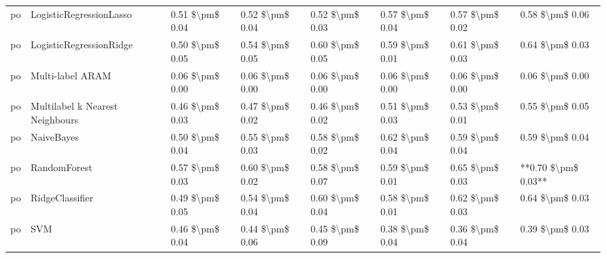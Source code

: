 \begin{tabular}{llllllll}
      po &         LogisticRegressionLasso & 0.51 \$\textbackslash pm\$ 0.04 &           0.52 \$\textbackslash pm\$ 0.04 &       0.52 \$\textbackslash pm\$ 0.03 &        0.57 \$\textbackslash pm\$ 0.04 &                         0.57 \$\textbackslash pm\$ 0.02 &     0.58 \$\textbackslash pm\$ 0.06 \\
      po &         LogisticRegressionRidge & 0.50 \$\textbackslash pm\$ 0.05 &           0.54 \$\textbackslash pm\$ 0.05 &       0.60 \$\textbackslash pm\$ 0.05 &        0.59 \$\textbackslash pm\$ 0.01 &                         0.61 \$\textbackslash pm\$ 0.03 &     0.64 \$\textbackslash pm\$ 0.03 \\
      po &                Multi-label ARAM & 0.06 \$\textbackslash pm\$ 0.00 &           0.06 \$\textbackslash pm\$ 0.00 &       0.06 \$\textbackslash pm\$ 0.00 &        0.06 \$\textbackslash pm\$ 0.00 &                         0.06 \$\textbackslash pm\$ 0.00 &     0.06 \$\textbackslash pm\$ 0.00 \\
      po & Multilabel k Nearest Neighbours & 0.46 \$\textbackslash pm\$ 0.03 &           0.47 \$\textbackslash pm\$ 0.02 &       0.46 \$\textbackslash pm\$ 0.02 &        0.51 \$\textbackslash pm\$ 0.03 &                         0.53 \$\textbackslash pm\$ 0.01 &     0.55 \$\textbackslash pm\$ 0.05 \\
      po &                      NaiveBayes & 0.50 \$\textbackslash pm\$ 0.04 &           0.55 \$\textbackslash pm\$ 0.03 &       0.58 \$\textbackslash pm\$ 0.02 &        0.62 \$\textbackslash pm\$ 0.04 &                         0.59 \$\textbackslash pm\$ 0.04 &     0.59 \$\textbackslash pm\$ 0.04 \\
      po &                    RandomForest & 0.57 \$\textbackslash pm\$ 0.03 &           0.60 \$\textbackslash pm\$ 0.02 &       0.58 \$\textbackslash pm\$ 0.07 &        0.59 \$\textbackslash pm\$ 0.01 &                         0.65 \$\textbackslash pm\$ 0.03 & **0.70 \$\textbackslash pm\$ 0.03** \\
      po &                 RidgeClassifier & 0.49 \$\textbackslash pm\$ 0.05 &           0.54 \$\textbackslash pm\$ 0.04 &       0.60 \$\textbackslash pm\$ 0.04 &        0.58 \$\textbackslash pm\$ 0.01 &                         0.62 \$\textbackslash pm\$ 0.03 &     0.64 \$\textbackslash pm\$ 0.03 \\
      po &                             SVM & 0.46 \$\textbackslash pm\$ 0.04 &           0.44 \$\textbackslash pm\$ 0.06 &       0.45 \$\textbackslash pm\$ 0.09 &        0.38 \$\textbackslash pm\$ 0.04 &                         0.36 \$\textbackslash pm\$ 0.04 &     0.39 \$\textbackslash pm\$ 0.03 \\

\end{tabular}

